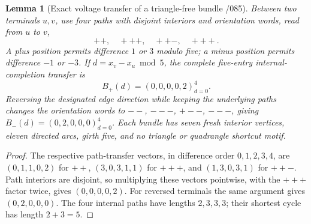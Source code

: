 \documentclass[11pt]{article}
\newtheorem{lemma}{Lemma}
\begin{document}
\begin{lemma}[Exact voltage transfer of a triangle-free bundle /085]
Between two terminals $u,v$, use four paths with disjoint
interiors and orientation words, read from $u$ to $v$,
\[
  ++,\quad +++,\quad ++-,\quad +++.
\]
A plus position permits difference $1$ or $3$ modulo five;
a minus position permits difference $-1$ or $-3$.
If $d=x_v-x_u\bmod5$, the complete five-entry
internal-completion transfer is
\[
 B_+(d)=(0,0,0,0,2)_{d=0}^4.
\]
Reversing the designated edge direction while keeping the
underlying paths changes the orientation words to
$--$, $---$, $+--$, $---$, giving
$B_-(d)=(0,2,0,0,0)_{d=0}^4$.
Each bundle has seven fresh interior vertices, eleven directed
arcs, girth five, and no triangle or quadrangle shortcut motif.
\end{lemma}
\begin{proof}
The respective path-transfer vectors, in difference order
$0,1,2,3,4$, are
$(0,1,1,0,2)$ for $++$,
$(3,0,3,1,1)$ for $+++$, and
$(1,3,0,3,1)$ for $++-$.
Path interiors are disjoint, so multiplying these vectors
pointwise, with the $+++$ factor twice, gives
$(0,0,0,0,2)$. For reversed terminals the same argument gives
$(0,2,0,0,0)$. The four internal paths have lengths $2,3,3,3$;
their shortest cycle has length $2+3=5$.
\end{proof}
\end{document}
